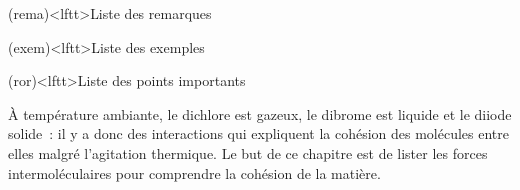 \documentclass[../../main/main.tex]{subfiles}
\begin{document}
\begin{boxes}
	\begin{tcb}(rema)<lftt>{Liste des remarques}
	\end{tcb}
	\begin{tcb}(exem)<lftt>{Liste des exemples}
	\end{tcb}
	\begin{tcb}(ror)<lftt>{Liste des points importants}
	\end{tcb}
\end{boxes}
\vspace*{\fill}
\newpage

À température ambiante, le dichlore est gazeux, le dibrome est liquide et le
diiode solide~: il y a donc des interactions qui expliquent la cohésion des
molécules entre elles malgré l'agitation thermique. Le but de ce chapitre est de
lister les forces intermoléculaires pour comprendre la cohésion de la matière.
\end{document}
